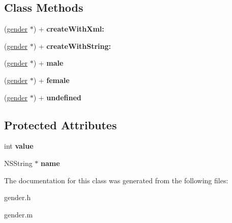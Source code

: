 \subsection*{Class Methods}
\begin{DoxyCompactItemize}
\item 
\hypertarget{interfacegender_a05b9e6638e9da89ae675f3803f4a9e89}{}(\hyperlink{interfacegender}{gender} $\ast$) + {\bfseries create\+With\+Xml\+:}\label{interfacegender_a05b9e6638e9da89ae675f3803f4a9e89}

\item 
\hypertarget{interfacegender_aa8231dc513444e516ca6d93b71d9ace3}{}(\hyperlink{interfacegender}{gender} $\ast$) + {\bfseries create\+With\+String\+:}\label{interfacegender_aa8231dc513444e516ca6d93b71d9ace3}

\item 
\hypertarget{interfacegender_aea69e7f2753159dbad0a375d21d269f4}{}(\hyperlink{interfacegender}{gender} $\ast$) + {\bfseries male}\label{interfacegender_aea69e7f2753159dbad0a375d21d269f4}

\item 
\hypertarget{interfacegender_ace59563a1e10c359fbca9a80afaf72d3}{}(\hyperlink{interfacegender}{gender} $\ast$) + {\bfseries female}\label{interfacegender_ace59563a1e10c359fbca9a80afaf72d3}

\item 
\hypertarget{interfacegender_a9e525a6739de391d8c4d2364b1199214}{}(\hyperlink{interfacegender}{gender} $\ast$) + {\bfseries undefined}\label{interfacegender_a9e525a6739de391d8c4d2364b1199214}

\end{DoxyCompactItemize}
\subsection*{Protected Attributes}
\begin{DoxyCompactItemize}
\item 
\hypertarget{interfacegender_a061fe95d69804b6411d0d7f81b5de17f}{}int {\bfseries value}\label{interfacegender_a061fe95d69804b6411d0d7f81b5de17f}

\item 
\hypertarget{interfacegender_ab89b25c6823fed592a4cdc3a7cc6f618}{}N\+S\+String $\ast$ {\bfseries name}\label{interfacegender_ab89b25c6823fed592a4cdc3a7cc6f618}

\end{DoxyCompactItemize}


The documentation for this class was generated from the following files\+:\begin{DoxyCompactItemize}
\item 
gender.\+h\item 
gender.\+m\end{DoxyCompactItemize}
